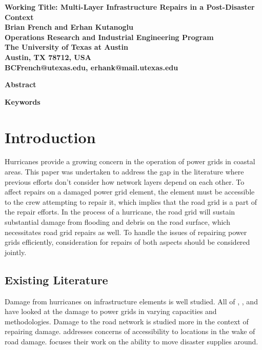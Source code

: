 \documentclass[10pt]{article}
\begin{document}
\newpage
\thispagestyle{empty}
\begin{center}
{\Large \textbf{ Working Title: Multi-Layer Infrastructure Repairs in a Post-Disaster Context}} \\
\vspace*{0.2cm}
{\large \textbf{Brian French and Erhan Kutanoglu}} \\
{\large \textbf{Operations Research and Industrial Engineering Program}} \\
{\large \textbf{The University of Texas at Austin}} \\
{\large \textbf{Austin, TX 78712, USA}} \\
{\large \textbf{BCFrench@utexas.edu, erhank@mail.utexas.edu}} \\
\end{center}

\thispagestyle{empty}
\begin{center}
{\large \bf Abstract}
\end{center}

\vspace*{-12pt}


{\large \bf Keywords}\\


\vspace*{-12pt}
\section{{\large Introduction}}
\label{sec:ic:intro}
\vspace*{-12pt}

Hurricanes provide a growing concern in the operation of power grids in coastal areas. This paper was undertaken to address the gap in the literature where previous efforts don't consider how network layers depend on each other. To affect  repairs on a damaged power grid element, the element must be accessible to the crew attempting to repair it, which implies that the road grid is a part of the repair efforts. In the process of a hurricane, the road grid will sustain substantial damage from flooding and debris on the road surface, which necessitates road grid repairs as well. To handle the issues of repairing power grids efficiently, consideration for repairs of both aspects should be considered jointly.

\subsection{\large Existing Literature}
\vspace*{-12pt}
Damage from hurricanes on infrastructure elements is well studied. All of \cite{WinklerEA2010}, \cite{ScherbEA2015}, and \cite{GuikemaEA2010} have looked at the damage to power grids in varying capacities and methodologies. Damage to the road network is studied more in the context of repairing damage. \cite{AksuEA2014} addresses concerns of accessibility to locations in the wake of road damage. \cite{DuqueEA2016} focuses their work on the ability to move disaster supplies around.
\end{document}
